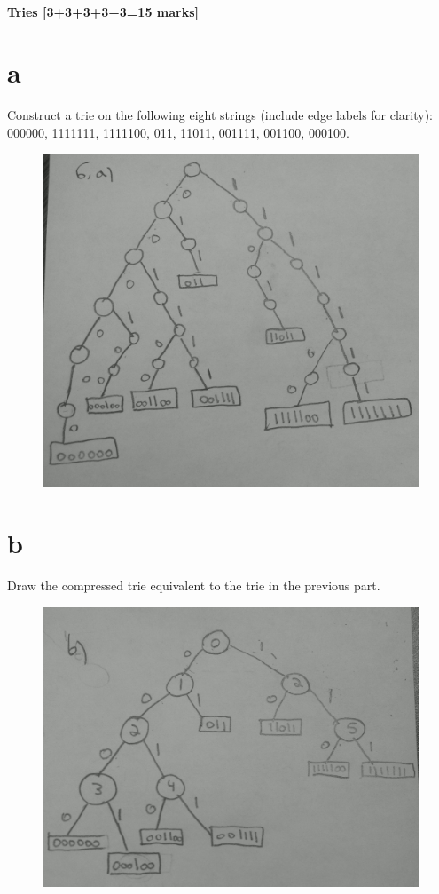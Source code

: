 \documentclass[12pt]{article}
\begin{document}
\subsection{Tries [3+3+3+3+3=15 marks]}
\begin{itemize}
\newpage
\part{a} Construct a trie on the following eight strings (include edge labels for clarity):\\ 000000, 1111111, 1111100, 011, 11011, 001111, 001100, 000100.
\begin{figure}[ht!]
\centering
\includegraphics[width=170mm]{6a.jpg}
\label{overflow}
\end{figure}
\newpage
\part{b} Draw the compressed trie equivalent to the trie in the previous part.
\begin{figure}[ht!]
\centering
\includegraphics[width=170mm]{6b.jpg}
\label{overflow}
\end{figure}
\newpage

\end{itemize}
\end{document}
